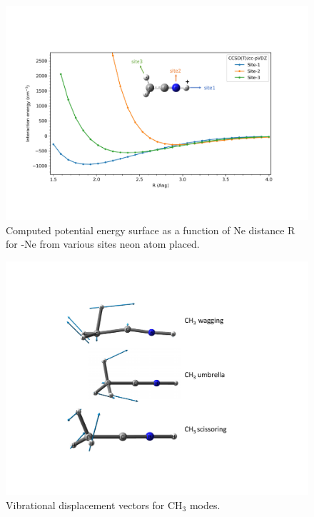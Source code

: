\documentclass[preprint,12pt]{elsarticle}
\begin{document}
\begin{figure}
	\centering
		\includegraphics[scale=.5]{figures/iso_comparison_with_Ne.pdf}
		\caption{Computed potential energy surface as a function of Ne distance R for \pan-Ne from various sites neon atom placed.}
	\label{FIG:bsse}
\end{figure}

\begin{figure}

	\centering
		\includegraphics[scale=.5]{figures/vibration_vector.pdf}
		\caption{Vibrational displacement vectors for CH$_3$ modes.}
	\label{FIG:ch3_modes}
\end{figure}

\newpage
\end{document}

